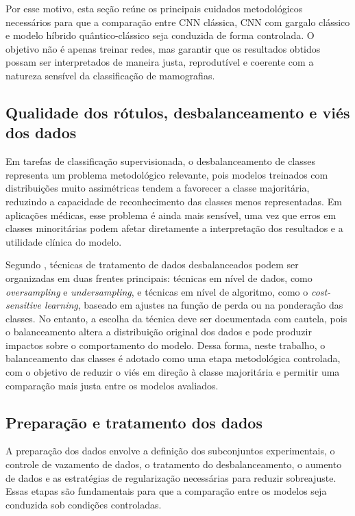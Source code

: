 \documentclass[
    12pt,
    openright,
    oneside,
    a4paper,
    english,
    brazil
]{abntex2}
\begin{document}
Por esse motivo, esta seção reúne os principais cuidados metodológicos necessários para que a comparação entre CNN clássica, CNN com gargalo clássico e modelo híbrido quântico-clássico seja conduzida de forma controlada. O objetivo não é apenas treinar redes, mas garantir que os resultados obtidos possam ser interpretados de maneira justa, reprodutível e coerente com a natureza sensível da classificação de mamografias.

\subsection{Qualidade dos rótulos, desbalanceamento e viés dos dados}
\label{subsec:qualidade_rotulos_balanceamento_vies}

Em tarefas de classificação supervisionada, o desbalanceamento de classes representa um problema metodológico relevante, pois modelos treinados com distribuições muito assimétricas tendem a favorecer a classe majoritária, reduzindo a capacidade de reconhecimento das classes menos representadas. Em aplicações médicas, esse problema é ainda mais sensível, uma vez que erros em classes minoritárias podem afetar diretamente a interpretação dos resultados e a utilidade clínica do modelo.

Segundo \cite{silva2025balanceamento}, técnicas de tratamento de dados desbalanceados podem ser organizadas em duas frentes principais: técnicas em nível de dados, como \textit{oversampling} e \textit{undersampling}, e técnicas em nível de algoritmo, como o \textit{cost-sensitive learning}, baseado em ajustes na função de perda ou na ponderação das classes. No entanto, a escolha da técnica deve ser documentada com cautela, pois o balanceamento altera a distribuição original dos dados e pode produzir impactos sobre o comportamento do modelo. Dessa forma, neste trabalho, o balanceamento das classes é adotado como uma etapa metodológica controlada, com o objetivo de reduzir o viés em direção à classe majoritária e permitir uma comparação mais justa entre os modelos avaliados.

\subsection{Preparação e tratamento dos dados}

A preparação dos dados envolve a definição dos subconjuntos experimentais, o controle de vazamento de dados, o tratamento do desbalanceamento, o aumento de dados e as estratégias de regularização necessárias para reduzir sobreajuste. Essas etapas são fundamentais para que a comparação entre os modelos seja conduzida sob condições controladas.
\end{document}
